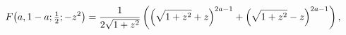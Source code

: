 \[\mathop{F\/}\nolimits\!\left(a,1-a;\tfrac{1}{2};-z^{2}\right)=\frac{1}{2\sqrt{%
1+z^{2}}}\left(\left(\sqrt{1+z^{2}}+z\right)^{2a-1}+\left(\sqrt{1+z^{2}}-z%
\right)^{2a-1}\right),\]